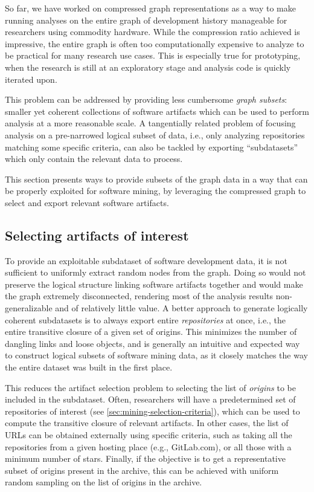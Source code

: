 So far, we have worked on compressed graph representations as a way to make
running analyses on the entire graph of development history manageable for
researchers using commodity hardware. While the compression ratio achieved is
impressive, the entire graph is often too computationally expensive to analyze
to be practical for many research use cases.  This is especially true for
prototyping, when the research is still at an exploratory stage and analysis
code is quickly iterated upon.

This problem can be addressed by providing less cumbersome \emph{graph
subsets}: smaller yet coherent collections of software artifacts which can be
used to perform analysis at a more reasonable scale. A tangentially related
problem of focusing analysis on a pre-narrowed logical subset of data, i.e.,
only analyzing repositories matching some specific criteria, can also be
tackled by exporting ``subdatasets'' which only contain the relevant data to
process.

This section presents ways to provide subsets of the graph data in a way that
can be properly exploited for software mining, by leveraging the compressed
graph to select and export relevant software artifacts.

\subsection{Selecting artifacts of interest}

To provide an exploitable subdataset of software development data, it is not
sufficient to uniformly extract random nodes from the graph. Doing so would not
preserve the logical structure linking software artifacts together and would
make the graph extremely disconnected, rendering most of the analysis results
non-generalizable and of relatively little value.
%
A better approach to generate logically coherent subdatasets is to always
export entire \emph{repositories} at once, i.e., the entire transitive closure
of a given set of origins. This minimizes the number of dangling links and
loose objects, and is generally an intuitive and expected way to construct
logical subsets of software mining data, as it closely matches the way the
entire dataset was built in the first place.

This reduces the artifact selection problem to selecting the list of
\emph{origins} to be included in the subdataset.
Often, researchers will have a predetermined set of repositories of interest
(see \cref{sec:mining-selection-criteria}), which can be used to compute the
transitive closure of relevant artifacts. In other cases, the list of URLs
can be obtained externally using specific criteria, such as taking all the
repositories from a given hosting place (e.g., GitLab.com), or all those with a
minimum number of stars. Finally, if the objective is to get a representative
subset of origins present in the archive, this can be achieved with uniform
random sampling on the list of origins in the archive.

